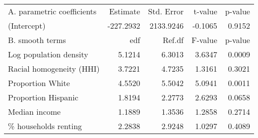 \begin{table}[ht]
\centering
\begin{tabular}{lrrrr}
   \hline
A. parametric coefficients & Estimate & Std. Error & t-value & p-value \\ 
  (Intercept) & -227.2932 & 2133.9246 & -0.1065 & 0.9152 \\ 
   \hline
B. smooth terms & edf & Ref.df & F-value & p-value \\ 
  Log population density & 5.1214 & 6.3013 & 3.6347 & 0.0009 \\ 
  Racial homogeneity (HHI) & 3.7221 & 4.7235 & 1.3161 & 0.3021 \\ 
  Proportion White & 4.5520 & 5.5042 & 5.0941 & 0.0011 \\ 
  Proportion Hispanic & 1.8194 & 2.2773 & 2.6293 & 0.0658 \\ 
  Median income & 1.1889 & 1.3536 & 1.2858 & 0.2714 \\ 
  \% households renting & 2.2838 & 2.9248 & 1.0297 & 0.4089 \\ 
   \hline
\end{tabular}
\caption{ } 
\label{Demographic GAM}
\end{table}
